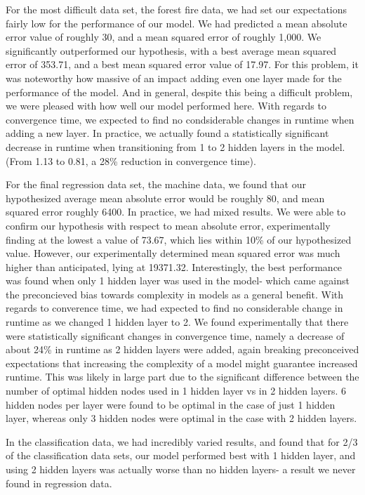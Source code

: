 \documentclass[twoside,11pt]{article}
\begin{document}
For the most difficult data set, the forest fire data, we had set our expectations fairly low for the performance of our
model. We had predicted a mean absolute error value of roughly 30, and a mean squared error of roughly 1,000. We significantly
outperformed our hypothesis, with a best average mean squared error of 353.71, and a best mean squared error value of 17.97.
For this problem, it was noteworthy how massive of an impact adding even one layer made for the performance of the model.
And in general, despite this being a difficult problem, we were pleased with how well our model performed here.
With regards to convergence time, we expected to find no condsiderable changes in runtime when adding a new layer. In practice,
we actually found a statistically significant decrease in runtime when transitioning from 1 to 2 hidden layers in the model. (From 1.13
to 0.81, a 28\% reduction in convergence time).

For the final regression data set, the machine data, we found that our hypothesized average mean absolute error would be roughly 80, 
and mean squared error roughly 6400. In practice, we had mixed results. We were able to confirm our hypothesis with respect to mean absolute
error, experimentally finding at the lowest a value of 73.67, which lies within 10\% of our hypothesized value. However, our experimentally
determined mean squared error was much higher than anticipated, lying at 19371.32. Interestingly, the best performance was found
when only 1 hidden layer was used in the model- which came against the preconcieved bias towards complexity in models as a general benefit.
With regards to converence time, we had expected to find no considerable change in runtime as we changed 1 hidden layer to 2. We found 
experimentally that there were statistically significant changes in convergence time, namely a decrease of about 24\% in runtime as
2 hidden layers were added, again breaking preconceived expectations that increasing the complexity of a model might guarantee
increased runtime. This was likely in large part due to the significant difference between the number of optimal hidden nodes used in 1 hidden
layer vs in 2 hidden layers. 6 hidden nodes per layer were found to be optimal in the case of just 1 hidden layer, whereas only 3 hidden nodes
were optimal in the case with 2 hidden layers.

In the classification data, we had incredibly varied results, and found that for 2/3 of the classification data sets, our model performed
best with 1 hidden layer, and using 2 hidden layers was actually worse than no hidden layers- a result we never found in regression data.
\end{document}
